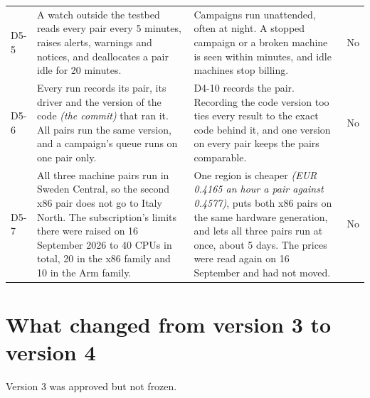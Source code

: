 \documentclass[11pt]{article}
\newcommand{\gl}[1]{{\color{soft}\itshape\small (#1)}}
\begin{document}
{\begin{longtable}{@{}p{1.0cm} >{\raggedright\arraybackslash}p{6.6cm} >{\raggedright\arraybackslash}p{5.9cm} >{\raggedright\arraybackslash}p{1.9cm}@{}}
D5-5 & A watch outside the testbed reads every pair every 5 minutes, raises alerts, warnings and notices, and deallocates a pair idle for 20 minutes. & Campaigns run unattended, often at night. A stopped campaign or a broken machine is seen within minutes, and idle machines stop billing. & No \\
D5-6 & Every run records its pair, its driver and the version of the code \gl{the commit} that ran it. All pairs run the same version, and a campaign's queue runs on one pair only. & D4-10 records the pair. Recording the code version too ties every result to the exact code behind it, and one version on every pair keeps the pairs comparable. & No \\
D5-7 & All three machine pairs run in Sweden Central, so the second x86 pair does not go to Italy North. The subscription's limits there were raised on 16 September 2026 to 40 CPUs in total, 20 in the x86 family and 10 in the Arm family. & One region is cheaper \gl{EUR 0.4165 an hour a pair against 0.4577}, puts both x86 pairs on the same hardware generation, and lets all three pairs run at once, about 5 days. The prices were read again on 16 September and had not moved. & No \\
\bottomrule
\end{longtable}}

\section*{What changed from version 3 to version 4}
Version 3 was approved but not frozen.
\end{document}
